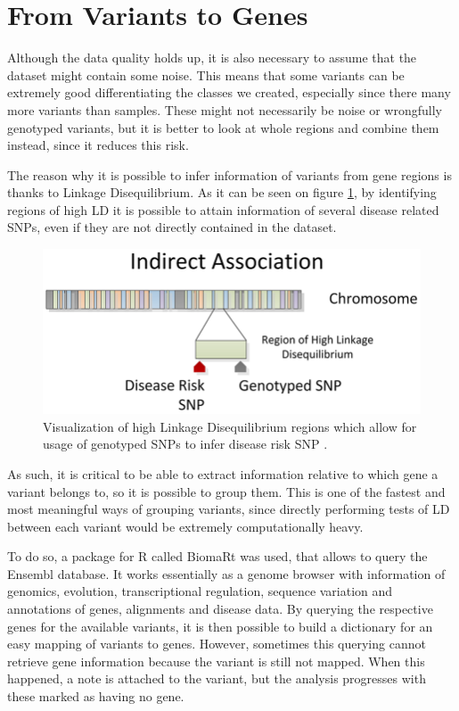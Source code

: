 \section{From Variants to Genes}

Although the data quality holds up, it is also necessary to assume that the dataset might contain some noise. This means that some variants can be extremely good differentiating the classes we created, especially since there many more variants than samples. These might not necessarily be noise or wrongfully genotyped variants, but it is better to look at whole regions and combine them instead, since it reduces this risk.  

The reason why it is possible to infer information of variants from gene regions is thanks to Linkage Disequilibrium. As it can be seen on figure \ref{fig:LD}, by identifying regions of high \gls{LD} it is possible to attain information of several disease related \gls{SNP}s, even if they are not directly contained in the dataset.

\begin{figure}[h]
	\centering
	\includegraphics[width=\textwidth]{../images/data_prep/LD.png}
	\caption{Visualization of high Linkage Disequilibrium regions which allow for usage of genotyped \gls{SNP}s to infer disease risk \gls{SNP} \cite{bush2012genome}.} 
	\label{fig:LD}
\end{figure}

As such, it is critical to be able to extract information relative to which gene a variant belongs to, so it is possible to group them. This is one of the fastest and most meaningful ways of grouping variants, since directly performing tests of \gls{LD} between each variant would be extremely computationally heavy.

To do so, a package for R called BiomaRt was used, that allows to query the Ensembl database. It works essentially as a genome browser with information of genomics, evolution, transcriptional regulation, sequence variation and annotations of genes, alignments and disease data. By querying the respective genes for the available variants, it is then possible to build a dictionary for an easy mapping of variants to genes. However, sometimes this querying cannot retrieve gene information because the variant is still not mapped. When this happened, a note is attached to the variant, but the analysis progresses with these marked as having no gene.
